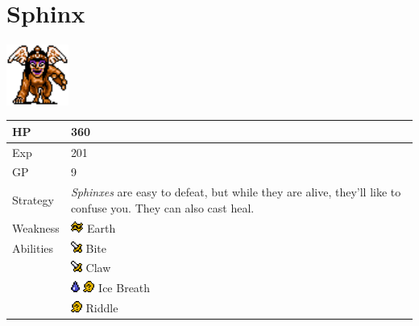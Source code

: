 \section{Sphinx}
\label{monster:sphinx}

\includegraphics[height=2cm,keepaspectratio]{./resources/monster/sphinx}

\begin{longtable}{ l p{9cm} }
	HP
	& 360
\\ \hline
	Exp
	& 201
\\ \hline
	GP
	& 9
\\ \hline
	Strategy
	& \textit{Sphinxes} are easy to defeat, but while they are alive, they'll like to confuse you. They can also cast heal.
\\ \hline
	Weakness
	& \includegraphics[height=1em,keepaspectratio]{./resources/effects/earth} Earth
\\ \hline
	Abilities
	& \includegraphics[height=1em,keepaspectratio]{./resources/effects/damage} Bite \\
	& \includegraphics[height=1em,keepaspectratio]{./resources/effects/damage} Claw \\
	& \includegraphics[height=1em,keepaspectratio]{./resources/effects/water} \includegraphics[height=1em,keepaspectratio]{./resources/effects/confusion} Ice Breath \\
	& \includegraphics[height=1em,keepaspectratio]{./resources/effects/confusion} Riddle
\end{longtable}
